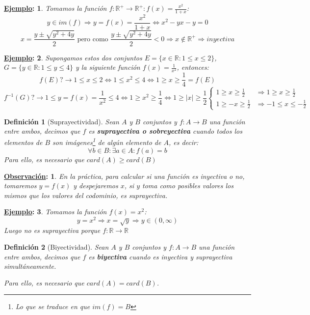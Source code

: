 \documentclass[10pt,a4paper,openright]{book}
\theoremstyle{break}
\newtheorem*{defi}{Definición}
\newtheorem*{obs}{\underline{Observación}:}
\newtheorem*{ej}{\underline{Ejemplo}:}
\begin{document}
\begin{ej}
Tomamos la función $f: \mathbb R^+ \rightarrow \mathbb R^+ : f(x)=\frac{x^2}{1+x}$:
$$y\in im(f)\Rightarrow y=f(x)=\frac{x^2}{1+x}\Leftrightarrow x^2-yx-y=0$$
$$x=\frac{y\pm \sqrt{y^2+4y}}{2}\mbox{ pero como }\frac{y\pm \sqrt{y^2+4y}}{2}<0\Rightarrow x\notin \mathbb R^+\Rightarrow inyectiva$$
\end{ej}

\begin{ej}
Supongamos estos dos conjuntos $E=\{x\in \mathbb R : 1\leq x\leq 2\}$, $G=\{y\in \mathbb R : 1\leq y\leq 4\}$ y la siguiente función $f(x)=\frac{1}{x^2}$, entonces:
$$f(E)?\rightarrow 1\leq x\leq 2\Leftrightarrow 1\leq x^2\leq 4\Leftrightarrow 1\geq x\geq \frac{1}{4}=f(E)$$
$$f^{-1}(G)?\rightarrow 1\leq y=f(x)=\frac{1}{x^2}\leq 4\Leftrightarrow 1\geq x^2\geq \frac{1}{4}\Leftrightarrow 1\geq |x|\geq \frac{1}{2} 
\begin{cases}
1\geq x\geq \frac{1}{2}& \Rightarrow 1\geq x\geq \frac{1}{2} \\
1\geq -x\geq \frac{1}{2}& \Rightarrow -1\leq x\leq -\frac{1}{2}
\end{cases}$$
\end{ej}

\begin{defi}[Suprayectividad]
Sean $A$ y $B$ conjuntos y $f: A \rightarrow B$ una función entre ambos, decimos que $f$ es \textbf{suprayectiva o sobreyectiva} cuando todos los elementos de $B$ son imágenes\footnote{Lo que se traduce en que $im(f)=B$} de algún elemento de $A$, es decir:
$$\forall b \in B : \exists a \in A : f(a)=b$$
Para ello, es necesario que $card(A)\geq card(B)$
\end{defi}

\begin{obs}
En la práctica, para calcular si una función es inyectiva o no, tomaremos $y=f(x)$ y despejaremos $x$, si $y$ toma como posibles valores los mismos que los valores del codominio, es suprayectiva.
\end{obs}

\begin{ej}
Tomamos la función $f(x)=x^2$:
$$y=x^2\Rightarrow x=\sqrt{y}\Rightarrow y\in (0,\infty)$$
Luego no es suprayectiva porque $f: \mathbb R \rightarrow \mathbb R$
\end{ej}

\begin{defi}[Biyectividad]
Sean $A$ y $B$ conjuntos y $f: A \rightarrow B$ una función entre ambos, decimos que $f$ es \textbf{biyectiva} cuando es inyectiva y suprayectiva simultáneamente.

Para ello, es necesario que $card(A) = card(B)$.
\end{defi}
\end{document}
